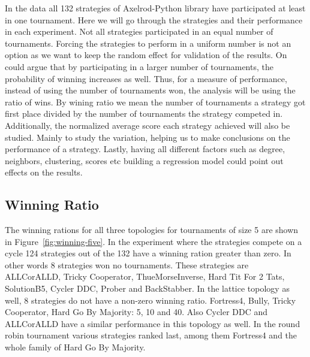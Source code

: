 In the data all 132 strategies of Axelrod-Python library have participated at
least in one tournament. Here we will go through the strategies and their
performance in each experiment. Not all strategies participated in an equal
number of tournaments. Forcing the strategies to perform in a uniform number is
not an option as we want to keep the random effect for validation of the
results. On could argue that by participating in a larger number of tournaments,
the probability of winning increases as well. Thus, for a measure of
performance, instead of using the number of tournaments won, the analysis will
be using the ratio of wins. By wining ratio we mean the number of tournaments a
strategy got first place divided by the number of tournaments the strategy
competed in. Additionally, the normalized average score each strategy achieved
will also be studied. Mainly to study the variation, helping us to make
conclusions on the performance of a strategy.  Lastly, having all different
factors such as degree, neighbors, clustering, scores etc building a regression
model could point out effects on the results.

\subsection{Winning Ratio}
\label{sub:winning-ratio}

The winning rations for all three topologies for tournaments of size 5
are shown in Figure~\ref{fig:winning-five}. In the experiment where the
strategies compete on a cycle 124 strategies out of the 132 have a
winning ration greater than zero. In other words 8 strategies won no
tournaments. These strategies are ALLCorALLD,
Tricky Cooperator, ThueMorseInverse, Hard Tit For 2 Tats, SolutionB5, Cycler DDC,
Prober and BackStabber.
In the lattice topology as well, 8 strategies do not have
a non-zero winning ratio. Fortress4, Bully, Tricky Cooperator, Hard Go
By Majority: 5, 10 and 40. Also Cycler DDC and ALLCorALLD have a similar
performance in this topology as well.
In the round robin tournament various strategies  %
ranked last, among them Fortress4 and the whole family of Hard Go By Majority.

